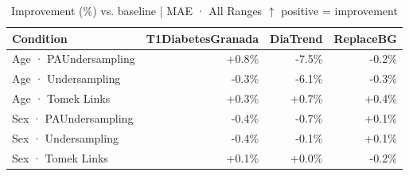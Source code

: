 \begin{table}[htbp]
\centering
\small
\caption{Improvement (\%) vs. baseline  |  MAE · All Ranges  $\uparrow$ positive = improvement}
\label{tab:delta_mae_entire_family_size_undersampling}
\begin{tabular}{lrrr}
\toprule
\textbf{Condition} & \textbf{T1DiabetesGranada} & \textbf{DiaTrend} & \textbf{ReplaceBG} \\
\midrule
Age · PAUndersampling & \textcolor{OliveGreen}{+0.8\%} & \textcolor{BrickRed}{-7.5\%} & \textcolor{BrickRed}{-0.2\%} \\
Age · Undersampling & \textcolor{BrickRed}{-0.3\%} & \textcolor{BrickRed}{-6.1\%} & \textcolor{BrickRed}{-0.3\%} \\
Age · Tomek Links & \textcolor{OliveGreen}{+0.3\%} & \textcolor{OliveGreen}{+0.7\%} & \textcolor{OliveGreen}{+0.4\%} \\
\midrule
Sex · PAUndersampling & \textcolor{BrickRed}{-0.4\%} & \textcolor{BrickRed}{-0.7\%} & \textcolor{OliveGreen}{+0.1\%} \\
Sex · Undersampling & \textcolor{BrickRed}{-0.4\%} & \textcolor{BrickRed}{-0.1\%} & \textcolor{OliveGreen}{+0.1\%} \\
Sex · Tomek Links & \textcolor{OliveGreen}{+0.1\%} & \textcolor{OliveGreen}{+0.0\%} & \textcolor{BrickRed}{-0.2\%} \\
\bottomrule
\end{tabular}
\end{table}